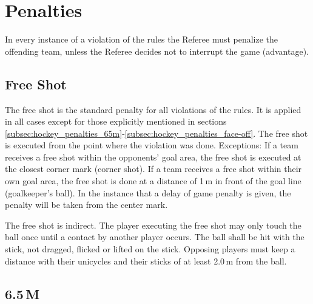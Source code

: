 \section{Penalties}

In every instance of a violation of the rules the Referee must penalize the offending team, unless the Referee decides not to interrupt the game (advantage).

\subsection{Free Shot}

The free shot is the standard penalty for all violations of the rules.
It is applied in all cases except for those explicitly mentioned in sections \ref{subsec:hockey_penalties_65m}-\ref{subsec:hockey_penalties_face-off}.
The free shot is executed from the point where the violation was done.
Exceptions: If a team receives a free shot within the opponents' goal area, the free shot is executed at the closest corner mark (corner shot).
If a team receives a free shot within their own goal area, the free shot is done at a distance of 1\,m in front of the goal line (goalkeeper's ball).
In the instance that a delay of game penalty is given, the penalty will be taken from the center mark.

The free shot is indirect.
The player executing the free shot may only touch the ball once until a contact by another player occurs.
The ball shall be hit with the stick, not dragged, flicked or lifted on the stick.
Opposing players must keep a distance with their unicycles and their sticks of at least 2.0\,m from the ball.

\subsection{6.5\,M \label{subsec:hockey_penalties_65m}}

